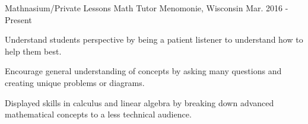 \begin{cventries}
  \cventry
    {Mathnasium/Private Lessons} %
    {Math Tutor} %
    {Menomonie, Wisconsin} %
    {Mar. 2016 - Present} %
    {
      \begin{cvitems} %
        \item {Understand students perspective by being a patient listener to understand how to help them best.}
        \item {Encourage general understanding of concepts by asking many questions and creating unique problems or diagrams.}
        \item {Displayed skills in calculus and linear algebra by breaking down advanced mathematical concepts to a less technical audience.}
      \end{cvitems}
    }



\end{cventries}
